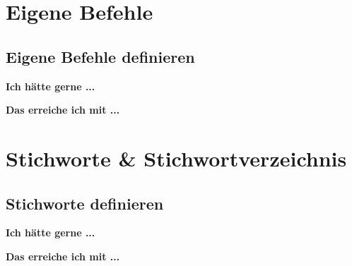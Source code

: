 \documentclass[twoside, 
               a4paper, 
              10pt, 
               parskip=full, 
               sectionentrydots=true, 
               listof=totoc, 
               listof=entryprefix,
               numbers=endperiod]{scrartcl}
\begin{document}

\newpage
\section{Eigene Befehle}
\subsection{Eigene Befehle definieren}

{\textbf {Ich hätte gerne ...}}
 
\begin{miniSeite}[colbacktitle=black!35!white,title=Ausdruck]

\end{miniSeite}


\newpage
{\textbf {Das erreiche ich mit ...}}
 
\begin{miniSeite}[colbacktitle=black!35!white,title=\LaTeX-Code]

\end{miniSeite}





\newpage
\section{Stichworte \& Stichwortverzeichnis}
\subsection{Stichworte definieren}

{\textbf {Ich hätte gerne ...}}
 
\begin{miniSeite}[colbacktitle=black!35!white,title=Ausdruck]

\end{miniSeite}


\newpage
{\textbf {Das erreiche ich mit ...}}
 
\begin{miniSeite}[colbacktitle=black!35!white,title=\LaTeX-Code]

\end{miniSeite}

\end{document}
